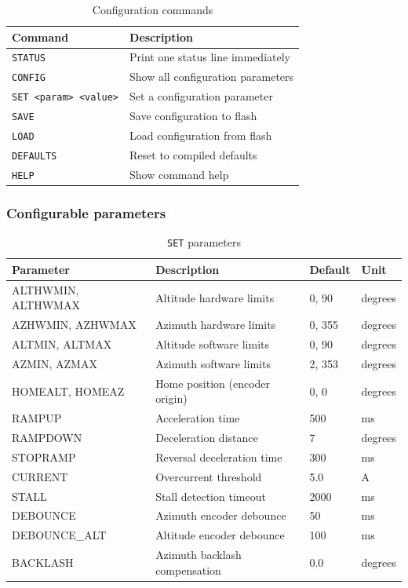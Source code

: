 \documentclass[11pt,a4paper]{article}
\begin{document}
\begin{table}[H]
\centering
\caption{Configuration commands}
\begin{tabular}{ll}
\toprule
\textbf{Command} & \textbf{Description} \\
\midrule
\texttt{STATUS} & Print one status line immediately \\
\texttt{CONFIG} & Show all configuration parameters \\
\texttt{SET <param> <value>} & Set a configuration parameter \\
\texttt{SAVE} & Save configuration to flash \\
\texttt{LOAD} & Load configuration from flash \\
\texttt{DEFAULTS} & Reset to compiled defaults \\
\texttt{HELP} & Show command help \\
\bottomrule
\end{tabular}
\end{table}

\subsubsection{Configurable parameters}

\begin{table}[H]
\centering
\caption{\texttt{SET} parameters}
\label{tab:setparams}
\begin{tabular}{llll}
\toprule
\textbf{Parameter} & \textbf{Description} & \textbf{Default} & \textbf{Unit} \\
\midrule
ALTHWMIN, ALTHWMAX & Altitude hardware limits & 0, 90 & degrees \\
AZHWMIN, AZHWMAX & Azimuth hardware limits & 0, 355 & degrees \\
ALTMIN, ALTMAX & Altitude software limits & 0, 90 & degrees \\
AZMIN, AZMAX & Azimuth software limits & 2, 353 & degrees \\
HOMEALT, HOMEAZ & Home position (encoder origin) & 0, 0 & degrees \\
RAMPUP & Acceleration time & 500 & ms \\
RAMPDOWN & Deceleration distance & 7 & degrees \\
STOPRAMP & Reversal deceleration time & 300 & ms \\
CURRENT & Overcurrent threshold & 5.0 & A \\
STALL & Stall detection timeout & 2000 & ms \\
DEBOUNCE & Azimuth encoder debounce & 50 & ms \\
DEBOUNCE\_ALT & Altitude encoder debounce & 100 & ms \\
BACKLASH & Azimuth backlash compensation\index{backlash compensation} & 0.0 & degrees \\
\bottomrule
\end{tabular}
\end{table}
\end{document}
